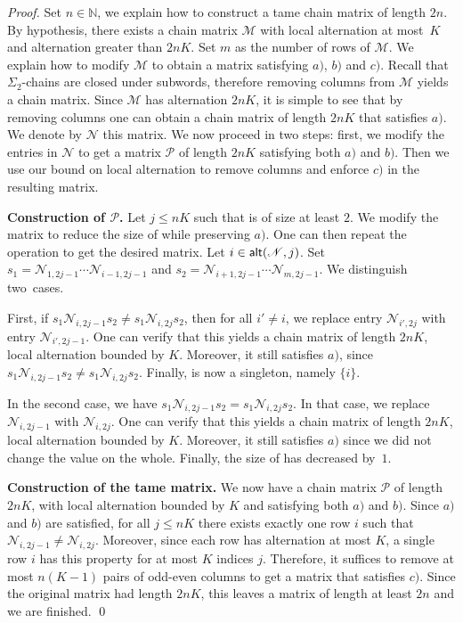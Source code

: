 \documentclass[envcountsame]{llncs}
\newcommand\nat{\ensuremath{\mathbb{N}}\xspace}
\newcommand\mat{\ensuremath{\mathscr{M}}\xspace}
\newcommand\mnat{\ensuremath{\mathscr{N}}\xspace}
\newcommand\pat{\ensuremath{\mathscr{P}}\xspace}
\newcommand{\sic}[1]{\ensuremath{\Sigma_{#1}}\xspace}
\let\leq\leqslant
\newcommand\chain{chain\xspace}
\newcommand\qchains[1]{\ensuremath{\sic{#1}}-chains\xspace}
\newcommand\dchains{\qchains{2}}
\begin{document}
\begin{proof}
  Set $n \in \nat$, we explain how to construct a tame \chain matrix of
  length $2n$. By hypothesis, there exists a \chain matrix \mat with
  local alternation at most~$K$ and alternation greater than $2nK$. Set
  $m$ as the number of rows of \mat. We explain how to modify \mat to
  obtain a matrix satisfying $a)$, $b)$ and $c)$. Recall that \dchains
  are closed under subwords, therefore removing columns from \mat yields
  a \chain matrix. Since \mat has alternation $2nK$, it is simple to see
  that by removing columns one can obtain a \chain matrix of length
  $2nK$ that satisfies $a)$. We denote by \mnat this matrix. We now
  proceed in two steps: first, we modify the entries in \mnat to get a
  matrix \pat of length $2nK$ satisfying both $a)$ and $b)$. Then we use
  our bound on local alternation to remove columns and enforce $c)$ in
  the resulting matrix.

  \medskip
  \noindent
  {\bf Construction of \pat.} Let $j \leq nK$ such that \alt{\mnat}{j} 
  is of size at least $2$. We modify the matrix to reduce
  the size of \alt{\mnat}{j} while preserving $a)$. One can then repeat
  the operation to get the desired matrix. Let $i \in \alt{\mnat}{j}$.
  Set $s_{1} = \mnat_{1,2j-1} \cdots \mnat_{i-1,2j-1}$ and $s_2 =
  \mnat_{i+1,2j-1} \cdots \mnat_{m,2j-1}$. We distinguish two~cases.

  First, if $s_1\mnat_{i,2j-1}s_2 \neq s_1\mnat_{i,2j}s_2$, then for all $i' \neq i$,
  we replace entry $\mnat_{i',2j}$ with entry $\mnat_{i',2j-1}$. One can verify
  that this yields a \chain matrix of length $2nK$, local alternation bounded by
  $K$. Moreover, it still satisfies $a)$, since $s_1\mnat_{i,2j-1}s_2 \neq
  s_1\mnat_{i,2j}s_2$. Finally, \alt{\mnat}{j} is now a singleton, namely $\{i\}$.

  In the second case, we have $s_1\mnat_{i,2j-1}s_2 = s_1\mnat_{i,2j}s_2$. In that
  case, we replace $\mnat_{i,2j-1}$ with $\mnat_{i,2j}$. One can
  verify that this yields a \chain matrix of length $2nK$, local
  alternation bounded by $K$. Moreover, it still satisfies $a)$ since we did not
  change the value on the whole. Finally,
  the size of \alt{\mnat}{j} has decreased by~$1$.

  \medskip
  \noindent
  {\bf Construction of the tame matrix.} We now have a \chain matrix
  \pat of length $2nK$, with local alternation bounded by $K$ and
  satisfying both $a)$ and $b)$. Since $a)$ and $b)$ are satisfied, for
  all $j \leq nK$ there exists exactly one row $i$ such that
  $\mnat_{i,2j-1} \neq \mnat_{i,2j}$. Moreover, since each row has
  alternation at most $K$, a single row $i$ has this property for at
  most $K$ indices $j$. Therefore, it suffices to remove at most
  $n(K-1)$ pairs of odd-even columns to get a matrix that satisfies
  $c)$. Since the original matrix had length $2nK$, this leaves a matrix
  of length at least $2n$ and we are finished. \qed 
\end{proof}
\end{document}
